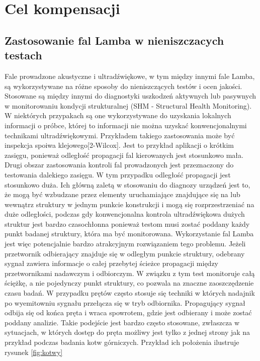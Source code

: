 
\section{Cel kompensacji}
\label{sec:cel_komp}

\subsection{Zastosowanie fal Lamba w nieniszczacych testach}

Fale prowadzone akustyczne i ultradźwiękowe, w tym między innymi fale Lamba, są wykorzystywane na różne sposoby do nieniszczących testów i ocen jakości. Stosowane są między innymi do diagnostyki uszkodzeń aktywnych lub pasywnych w monitorowaniu kondycji strukturalnej (SHM - Structural Health Monitoring). W niektórych przypakach są one wykorzystywane do uzyskania lokalnych informacji o próbce, której to informacji nie można uzyskać konwencjonalnymi technikami ultradźwiękowymi. Przykładem takiego zastosowania może być inspekcja spoiwa klejowego[2-Wilcox]. Jest to przykład aplikacji o krótkim zasięgu, ponieważ odległość propagacji fal kierowanych jest stosunkowo mała. Drugi obszar zastosowania kontroli fal prowadzonych jest przeznaczony do testowania dalekiego zasięgu. W tym przypadku odległość propagacji jest stosunkowo duża. Ich główną zaletą w stosowaniu do diagnozy urządzeń jest to, że mogą być wzbudzane przez elementy uruchamiające znajdujące się na lub wewnątrz struktury w jednym punkcie konstrukcji i mogą się rozprzestrzeniać na duże odległości, podczas gdy konwencjonalna kontrola ultradźwiękowa dużych struktur jest bardzo czasochłonna ponieważ testom musi zostać poddany każdy punkt badanej struktury, która ma być monitorowana. Wykorzystanie fal Lamba jest więc potencjalnie bardzo atrakcyjnym rozwiązaniem tego problemu. Jeżeli przetwornik odbierający znajduje się w odległym punkcie struktury, odebrany sygnał zawiera informacje o całej przebytej ścieżce propagacji między przetwornikami nadawczym i odbiorczym. W związku z tym test monitoruje całą ściężkę, a nie pojedynczy punkt struktury, co pozwala na znaczne zaoszczędzenie czasu badań. W przypadku prętów często stosuje się techniki w których nadajnik po wyemitowniu sygnału przełącza się w tryb odbiornika. Propagujący sygnał odbija się od końca pręta i wraca spowrotem, gdzie jest odbierany i może zostać poddany analizie. Takie podejście jest bardzo często stosowane, zwłaszcza w sytuacjach, w których dostęp do pręta możliwy jest tylko z jednej strony jak na przykład podczas badania kotw górniczych. Przykład ich położenia ilustruje rysunek \ref{fig:kotwy}
